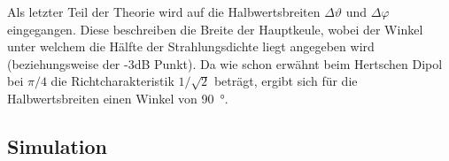Als letzter Teil der Theorie wird auf die Halbwertsbreiten $\Delta \vartheta$ und $\Delta \varphi$ eingegangen. Diese beschreiben die Breite der Hauptkeule, wobei der Winkel unter welchem die Hälfte der Strahlungsdichte liegt angegeben wird (beziehungsweise der -3dB Punkt). Da wie schon erwähnt beim Hertschen Dipol bei $\pi/4$ die Richtcharakteristik $1/\sqrt{2}$ beträgt, ergibt sich für die Halbwertsbreiten einen Winkel von \SI{90}{\degree}.

\subsection{Simulation}


